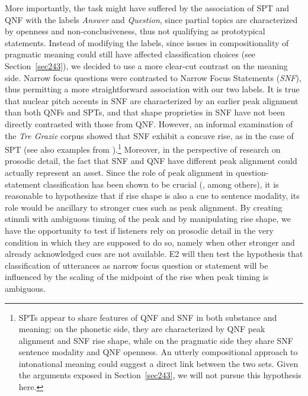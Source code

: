 More importantly, the task might have suffered by the association of SPT and QNF with the labels \textit{Answer} and \textit{Question}, since partial topics are characterized by openness and non-conclusiveness, thus not qualifying as prototypical statements. Instead of modifying the labels, since issues in compositionality of pragmatic meaning could still have affected classification choices (see Section~\ref{sec243}), we decided to use a more clear-cut contrast on the meaning side. Narrow focus questions were contrasted to Narrow Focus Statements (\textit{SNF}), thus permitting a more straightforward association with our two labels. It is true that nuclear pitch accents in SNF are characterized by an earlier peak alignment than both QNFs and SPTs, and that shape proprieties in SNF have not been directly contrasted with those from QNF. However, an informal examination of the \textit{Tre Grazie} corpus showed that SNF exhibit a concave rise, as in the case of SPT (see also examples from \citealt{dimperio2008phonetics}).\footnote{SPTs appear to share features of QNF and SNF in both substance and meaning: on the phonetic side, they are characterized by QNF peak alignment and SNF rise shape, while on the pragmatic side they share SNF sentence modality and QNF openness. An utterly compositional approach to intonational meaning could suggest a direct link between the two sets. Given the arguments exposed in Section~\ref{sec243}, we will not pursue this hypothesis here.} Moreover, in the perspective of research on prosodic detail, the fact that SNF and QNF have different peak alignment could actually represent an asset. Since the role of peak alignment in question-statement classification has been shown to be crucial (\citealt{dimperio2002italian}, among others), it is reasonable to hypothesize that if rise shape is also a cue to sentence modality, its role would be ancillary to stronger cues such as peak alignment. By creating stimuli with ambiguous timing of the peak and by manipulating rise shape, we have the opportunity to test if listeners rely on prosodic detail in the very condition in which they are supposed to do so, namely when other stronger and already acknowledged cues are not available. E2 will then test the hypothesis that classification of utterances as narrow focus question or statement will be influenced by the scaling of the midpoint of the rise when peak timing is ambiguous. 

